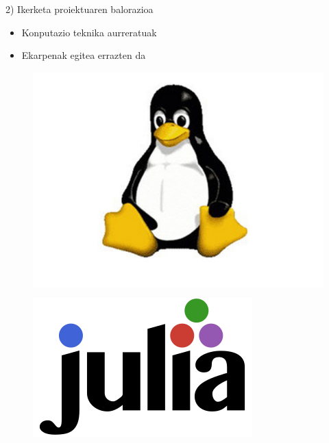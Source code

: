 \documentclass[
 10pt,%
 compress,%
 t,       %
 xcolor=svgnames
]{beamer}
\theoremstyle{definition} \newtheorem{definicion}{Definicion}[section]
\theoremstyle{propiedades} \newtheorem{propiedades}{Propiedades}[section]
\begin{document}
\begin{frame}{2) Ikerketa proiektuaren balorazioa}
\begin{itemize}
\begin{itemize}
	\medskip
	\item Konputazio teknika aurreratuak
	\medskip
	\item Ekarpenak egitea errazten da  
	
\end{itemize}


\begin{figure}
%
%
\begin{minipage}{.4\textwidth}
	\colorbox{white}  {\includegraphics[width=0.8\linewidth]{SoftwareLibre}}
\end{minipage}
%
\begin{minipage}{.4\textwidth}
\colorbox{white}  {\includegraphics[width=0.5\linewidth]{julia-logo-color}}
\end{minipage}
%

%
\end{figure}


\end{itemize}


\end{frame}
\end{document}
